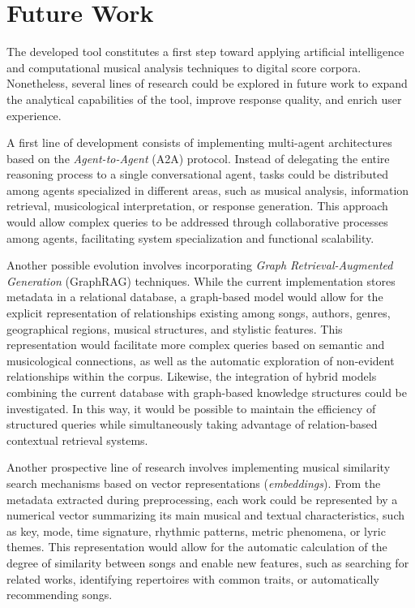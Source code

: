 \section{Future Work}
The developed tool constitutes a first step toward applying artificial intelligence and computational musical analysis techniques to digital score corpora. Nonetheless, several lines of research could be explored in future work to expand the analytical capabilities of the tool, improve response quality, and enrich user experience.

A first line of development consists of implementing multi-agent architectures based on the \textit{Agent-to-Agent} (A2A) protocol. Instead of delegating the entire reasoning process to a single conversational agent, tasks could be distributed among agents specialized in different areas, such as musical analysis, information retrieval, musicological interpretation, or response generation. This approach would allow complex queries to be addressed through collaborative processes among agents, facilitating system specialization and functional scalability.

Another possible evolution involves incorporating \textit{Graph Retrieval-Augmented Generation} (GraphRAG) techniques. While the current implementation stores metadata in a relational database, a graph-based model would allow for the explicit representation of relationships existing among songs, authors, genres, geographical regions, musical structures, and stylistic features. This representation would facilitate more complex queries based on semantic and musicological connections, as well as the automatic exploration of non-evident relationships within the corpus. Likewise, the integration of hybrid models combining the current database with graph-based knowledge structures could be investigated. In this way, it would be possible to maintain the efficiency of structured queries while simultaneously taking advantage of relation-based contextual retrieval systems.

Another prospective line of research involves implementing musical similarity search mechanisms based on vector representations (\textit{embeddings}). From the metadata extracted during preprocessing, each work could be represented by a numerical vector summarizing its main musical and textual characteristics, such as key, mode, time signature, rhythmic patterns, metric phenomena, or lyric themes. This representation would allow for the automatic calculation of the degree of similarity between songs and enable new features, such as searching for related works, identifying repertoires with common traits, or automatically recommending songs.

